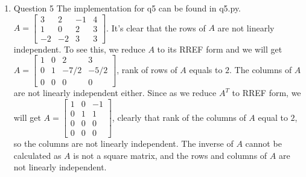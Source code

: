 \documentclass[11pt]{article}
\begin{document}
\begin{enumerate}
\item Question 5\newline
The implementation for q5 can be found in q5.py. $A = \begin{bmatrix} 3 & 2 & -1 & 4 \\ 1 & 0 & 2 & 3 \\ -2 & -2 & 3 & 3\end{bmatrix}$. It's clear that the rows of $A$ are not linearly independent. To see this, we reduce $A$ to its RREF form and we will get $A = \begin{bmatrix} 1 & 0 & 2 & 3 \\ 0 & 1 & -7/2 & -5/2 \\ 0 & 0 & 0 & 0\end{bmatrix}$, rank of rows of $A$ equals to $2$. The columns of $A$ are not linearly independent either. Since as we reduce $A^T$ to RREF form, we will get $A = \begin{bmatrix} 1 &0 & -1 \\ 0 & 1 & 1 \\ 0 & 0 & 0 \\ 0 & 0 & 0\end{bmatrix}$, clearly that rank of the columns of $A$ equal to $2$, so the columns are not linearly independent. The inverse of $A$ cannot be calculated as $A$ is not a square matrix, and the rows and columns of $A$ are not linearly independent.\\



\end{enumerate}
\end{document}
